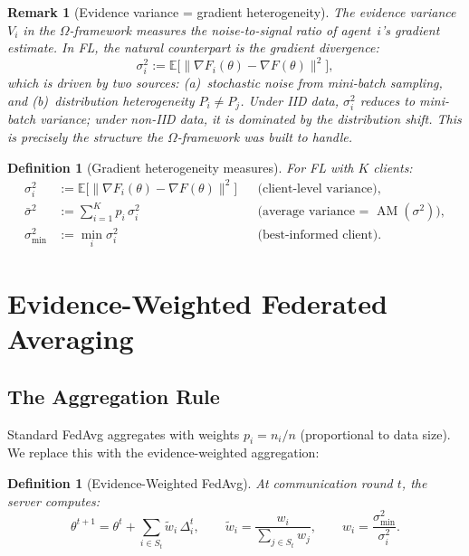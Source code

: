 \documentclass[11pt,a4paper]{article}
\newtheorem{definition}[theorem]{Definition}
\newtheorem{remark}[theorem]{Remark}
\DeclareMathOperator{\AM}{AM}
\newcommand{\E}{\mathbb{E}}
\newcommand{\norm}[1]{\|#1\|}
\begin{document}
\begin{remark}[Evidence variance = gradient heterogeneity]
The evidence variance $V_i$ in the $\Omega$-framework measures the
noise-to-signal ratio of agent~$i$'s gradient estimate. In FL, the
natural counterpart is the \emph{gradient divergence}:
\begin{equation}\label{eq:grad-div}
  \sigma_i^2 := \E\bigl[\norm{\nabla F_i(\theta) - \nabla F(\theta)}^2\bigr],
\end{equation}
which is driven by two sources: (a)~stochastic noise from mini-batch
sampling, and (b)~\emph{distribution heterogeneity} $P_i \neq P_j$.
Under IID data, $\sigma_i^2$ reduces to mini-batch variance; under
non-IID data, it is dominated by the distribution shift. This is
precisely the structure the $\Omega$-framework was built to handle.
\end{remark}

\begin{definition}[Gradient heterogeneity measures]\label{def:heterogeneity}
For FL with $K$ clients:
\begin{align}
  \sigma_i^2 &:= \E\bigl[\norm{\nabla F_i(\theta) - \nabla F(\theta)}^2\bigr]
    &&\text{(client-level variance)}, \label{eq:sigma-i}\\
  \bar{\sigma}^2 &:= \sum_{i=1}^{K} p_i\, \sigma_i^2
    &&\text{(average variance = $\AM(\sigma^2)$)}, \label{eq:sigma-bar}\\
  \sigma_{\min}^2 &:= \min_{i} \sigma_i^2
    &&\text{(best-informed client)}. \label{eq:sigma-min}
\end{align}
\end{definition}


\section{Evidence-Weighted Federated Averaging}
\label{sec:ew-fedavg}

\subsection{The Aggregation Rule}

Standard FedAvg aggregates with weights $p_i = n_i / n$ (proportional to
data size). We replace this with the evidence-weighted aggregation:

\begin{definition}[Evidence-Weighted FedAvg]\label{def:ew-fedavg}
At communication round $t$, the server computes:
\begin{equation}\label{eq:ew-agg}
  \theta^{t+1} = \theta^t + \sum_{i \in S_t} \tilde{w}_i\, \Delta_i^t,
  \qquad \tilde{w}_i = \frac{w_i}{\sum_{j \in S_t} w_j},
  \qquad w_i = \frac{\sigma_{\min}^2}{\sigma_i^2}.
\end{equation}
\end{definition}
\end{document}

